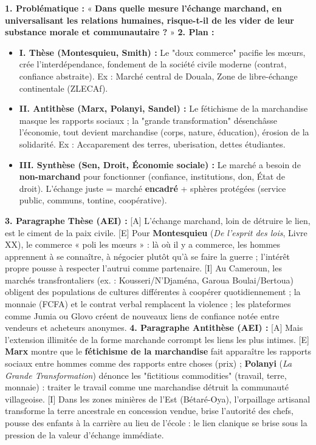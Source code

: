 \documentclass[11pt]{article}
\begin{document}
\begin{corrige}
\textbf{1. Problématique :} « \textbf{Dans quelle mesure l'échange marchand, en universalisant les relations humaines, risque-t-il de les vider de leur substance morale et communautaire ?} »
\textbf{2. Plan :}
\begin{itemize}
    \item \textbf{I. Thèse (Montesquieu, Smith) :} Le "doux commerce" pacifie les mœurs, crée l'interdépendance, fondement de la société civile moderne (contrat, confiance abstraite). Ex : Marché central de Douala, Zone de libre-échange continentale (ZLECAf).
    \item \textbf{II. Antithèse (Marx, Polanyi, Sandel) :} Le fétichisme de la marchandise masque les rapports sociaux ; la "grande transformation" désenchâsse l'économie, tout devient marchandise (corps, nature, éducation), érosion de la solidarité. Ex : Accaparement des terres, uberisation, dettes étudiantes.
    \item \textbf{III. Synthèse (Sen, Droit, Économie sociale) :} Le marché a besoin de \textbf{non-marchand} pour fonctionner (confiance, institutions, don, État de droit). L'échange juste = marché \textbf{encadré} + sphères protégées (service public, communs, tontine, coopérative).
\end{itemize}
\textbf{3. Paragraphe Thèse (AEI) :}
[A] L'échange marchand, loin de détruire le lien, est le ciment de la paix civile. [E] Pour \textbf{Montesquieu} (\emph{De l'esprit des lois}, Livre XX), le commerce « poli les mœurs » : là où il y a commerce, les hommes apprennent à se connaître, à négocier plutôt qu'à se faire la guerre ; l'intérêt propre pousse à respecter l'autrui comme partenaire. [I] Au Cameroun, les marchés transfrontaliers (ex. : Kousseri/N'Djaména, Garoua Boulai/Bertoua) obligent des populations de cultures différentes à coopérer quotidiennement ; la monnaie (FCFA) et le contrat verbal remplacent la violence ; les plateformes comme Jumia ou Glovo créent de nouveaux liens de confiance notée entre vendeurs et acheteurs anonymes.
\textbf{4. Paragraphe Antithèse (AEI) :}
[A] Mais l'extension illimitée de la forme marchande corrompt les liens les plus intimes. [E] \textbf{Marx} montre que le \textbf{fétichisme de la marchandise} fait apparaître les rapports sociaux entre hommes comme des rapports entre choses (prix) ; \textbf{Polanyi} (\emph{La Grande Transformation}) dénonce les "fictitious commodities" (travail, terre, monnaie) : traiter le travail comme une marchandise détruit la communauté villageoise. [I] Dans les zones minières de l'Est (Bétaré-Oya), l'orpaillage artisanal transforme la terre ancestrale en concession vendue, brise l'autorité des chefs, pousse des enfants à la carrière au lieu de l'école : le lien clanique se brise sous la pression de la valeur d'échange immédiate.
\end{corrige}
\end{document}
